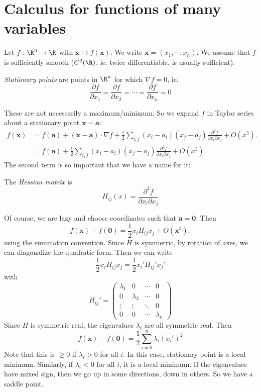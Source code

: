 \documentclass[a4paper]{article}
\begin{document}
\section{Calculus for functions of many variables}
Let $f: \R^n \to \R$ with $\mathbf{x} \mapsto f(\mathbf{x})$. We write $\mathbf{x} = (x_1, \cdots, x_n)$. We assume that $f$ is sufficiently smooth ($C^2(\R)$, ie. twice differentiable, is usually sufficient).
\begin{defi}
  \emph{Stationary points} are points in $\R^n$ for which $\nabla f = 0$, ie.
  \[
    \frac{\partial f}{\partial x_1} = \frac{\partial f}{\partial x_2} = \cdots = \frac{\partial f}{\partial x_n} = 0
  \]
\end{defi}
These are not necessarily a maximum/minimum. So we expand $f$ in Taylor series about a stationary point $\mathbf{x} = \mathbf{a}$:
\begin{align*}
  f(\mathbf{x}) &= f(\mathbf{a}) + (\mathbf{x} - \mathbf{a})\cdot \nabla f + \frac{1}{2}\sum_{i, j}(x_i - a_i)(x_j - a_j)\frac{\partial^2 f}{\partial x_i \partial x_j} + O(x^3).\\
  &= f(\mathbf{a}) + \frac{1}{2}\sum_{i, j}(x_i - a_i)(x_j - a_j)\frac{\partial^2 f}{\partial x_i \partial x_j} + O(x^3).
\end{align*}
The second term is so important that we have a name for it:
\begin{defi}
  The \emph{Hessian matrix} is
  \[
    H_{ij}(x) = \frac{\partial^2 f}{\partial x_i \partial x_j}
  \]
\end{defi}
Of course, we are lazy and choose coordinates such that $\mathbf{a} = \mathbf{0}$. Then
\[
  f(\mathbf{x}) - f(\mathbf{0}) = \frac{1}{2}x_i H_{ij}x_j + O(\mathbf{x}^3),
\]
using the summation convention. Since $H$ is symmetric, by rotation of axes, we can diagonalize the quadratic form. Then we can write
\[
  \frac{1}{2}x_i H_{ij}x_j = \frac{1}{2}x_i' H_{ij}'x_j'
\]
with
\[
  H_{ij}' =
  \begin{pmatrix}
    \lambda_1 & 0 & \cdots & 0\\
    0 & \lambda_2 & \cdots & 0\\
    \vdots & \vdots & \ddots & 0\\
    0 & 0 & \cdots & \lambda_n
  \end{pmatrix}
\]
Since $H$ is symmetric real, the eigenvalues $\lambda_i$ are all symmetric real. Then
\[
  f(\mathbf{x}) - f(\mathbf{0}) = \frac{1}{2}\sum_{i = 0}^n \lambda_i (x_i')^2
\]
Note that this is $\geq 0$ if $\lambda_i > 0$ for all $i$. In this case, stationary point is a local minimum. Similarly, if $\lambda_i < 0$ for all $i$, it is a local minimum. If the eigenvalues have mixed sign, then we go up in some directions, down in others. So we have a saddle point.
\end{document}
